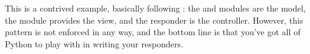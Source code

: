 This is a contrived example, basically following : the
 and  modules are the model, the 
module provides the view, and the responder is the controller. However, this
pattern is not enforced in any way, and the bottom line is that you've got all
of Python to play with in writing your responders.
